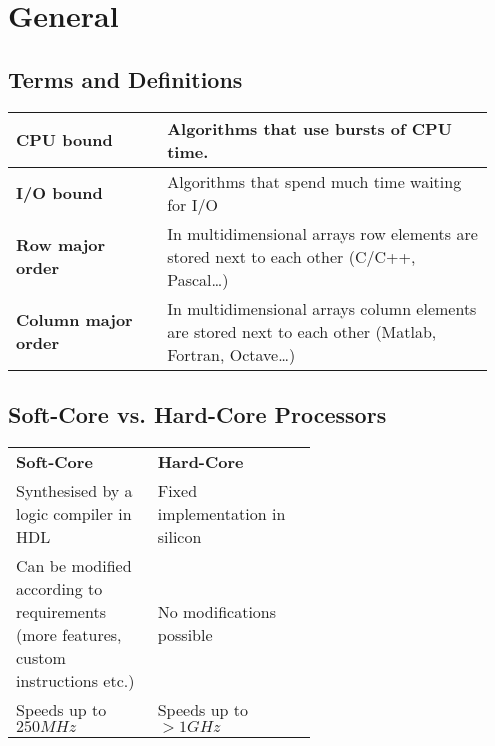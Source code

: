 \section{General}
	\subsection{Terms and Definitions}
		\begin{table}[H]
			\centering
			\begin{tabular}{|p{0.3\linewidth}|p{0.65\linewidth}|}
				 \hline
				 \textbf{CPU bound} 
				 	& Algorithms that use bursts of CPU time.\\
				 \hline
				 \textbf{I/O bound}  
				 	& Algorithms that spend much time waiting for I/O\\
				 \hline		
				 \textbf{Row major order}  
				 	& In multidimensional arrays row elements are stored next to each other (C/C++, Pascal\ldots)\\
				 \hline
				 \textbf{Column major order}  
				 	& In multidimensional arrays column elements are stored next to each other (Matlab, Fortran, Octave\ldots)\\
				\hline
			\end{tabular}
		\end{table}
		
	\subsection{Soft-Core vs. Hard-Core Processors}
	
		\begin{table}[H]
			\centering
			\begin{tabular}{|p{0.3\linewidth}|p{0.3\linewidth}|}
				 \hline
				 \textbf{Soft-Core} 
				 	& \textbf{Hard-Core}\\
				 \hhline{|=|=|}
				 Synthesised by a logic compiler in HDL  
				 	& Fixed implementation in silicon\\
				 \hline
				 Can be modified according to requirements (more features, custom
				 instructions etc.)
				 	& No modifications possible\\
				 \hline
				 Speeds up to $250MHz$
				 	& Speeds up to $>1GHz$\\
				 \hline			
			\end{tabular}
		\end{table}
		
	